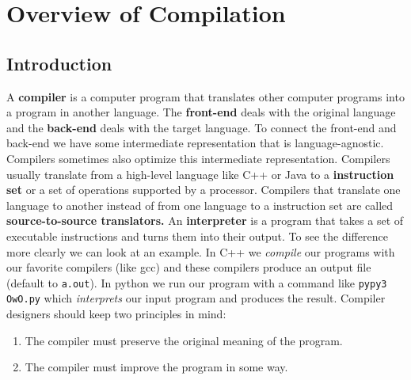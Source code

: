 \documentclass{article}
\begin{document}
\title{}
\author{Delon Shen}
\lstset{language=c++,     numbers=left}
\noindent
\tableofcontents
\section{Overview of Compilation}
\subsection{Introduction}
A \textbf{compiler} is a computer program that translates other computer programs into a program in another language. The \textbf{front-end} deals with the original language and the \textbf{back-end} deals with the target language. To connect the front-end and back-end we have some intermediate representation that is language-agnostic. Compilers sometimes also optimize this intermediate representation. Compilers usually translate from a high-level language like C++ or Java to a \textbf{instruction set} or a set of operations supported by a processor. Compilers that translate one language to another instead of from one language to a instruction set are called \textbf{source-to-source translators.} An \textbf{interpreter} is a program that takes a set of executable instructions and turns them into their output. To see the difference more clearly we can look at an example. In C++ we \textit{compile} our programs with our favorite compilers (like gcc) and these compilers produce an output file (default to \texttt{a.out}). In python we run our program with a command like \texttt{pypy3 OwO.py} which \textit{interprets} our input program and produces the result. Compiler designers should keep two principles in mind:
\begin{enumerate}
  \item The compiler must preserve the original meaning of the program.
  \item The compiler must improve the program in some way.
\end{enumerate}
\end{document}

